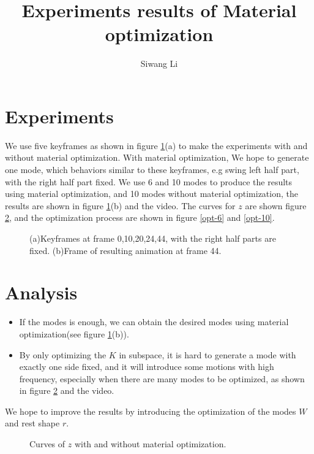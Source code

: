 \documentclass[9pt,twocolumn]{extarticle}
\author{Siwang Li}
\title{Experiments results of Material optimization}
\begin{document}
\maketitle

\setlength{\parskip}{0.5ex}

\section{Experiments}
We use five keyframes as shown in figure \ref{rlst}(a) to make the experiments
with and without material optimization. With material optimization, We hope to
generate one mode, which behaviors similar to these keyframes, e.g swing left
half part, with the right half part fixed. We use 6 and 10 modes to produce the
results using material optimization, and 10 modes without material optimization,
the results are shown in figure \ref{rlst}(b) and the video. The curves for $z$
are shown figure \ref{curves-z}, and the optimization process are shown in
figure \ref{opt-6} and \ref{opt-10}.

\begin{figure}
  \centering
  \caption{(a)Keyframes at frame 0,10,20,24,44, with the right half parts are
    fixed. (b)Frame of resulting animation at frame 44.}
  \label{rlst}
\end{figure}

\section{Analysis}
\begin{itemize}
\item If the modes is enough, we can obtain the desired modes using material
optimization(see figure \ref{rlst}(b)).
\item By only optimizing the $K$ in subspace, it is hard to generate a mode with
  exactly one side fixed, and it will introduce some motions with high
  frequency, especially when there are many modes to be optimized, as shown in
  figure \ref{curves-z} and the video. 
\end{itemize}
We hope to improve the results by introducing the optimization of the modes $W$
and rest shape $r$.

\begin{figure}
  \centering
  \caption{Curves of $z$ with and without material optimization.}
  \label{curves-z}
\end{figure}
\end{document}
